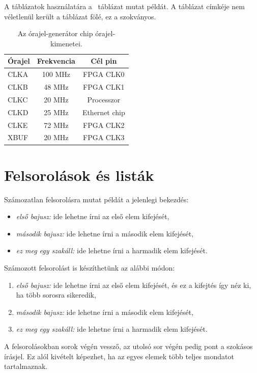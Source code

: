 A táblázatok használatára a ~táblázat mutat példát.
A táblázat címkéje nem véletlenül került a táblázat fölé, ez a szokványos.
\begin{table}[ht]
	\footnotesize
	\centering
	\caption{Az órajel-generátor chip órajel-kimenetei.} \label{tab:SysClocks}
	\begin{tabular}{ | l | c | c |}
	\hline
	Órajel & Frekvencia & Cél pin \\ \hline
	CLKA & 100 MHz & FPGA CLK0\\
	CLKB & 48 MHz  & FPGA CLK1\\
	CLKC & 20 MHz  & Processzor\\
	CLKD & 25 MHz  & Ethernet chip \\
	CLKE & 72 MHz  & FPGA CLK2\\
	XBUF & 20 MHz  & FPGA CLK3\\
	\hline
	\end{tabular}
	\label{tab:TabularExample}
\end{table}


\section{Felsorolások és listák}
Számozatlan felsorolásra mutat példát a jelenlegi bekezdés:
\begin{itemize}
	\item \emph{első bajusz:} ide lehetne írni az első elem kifejését,
	\item \emph{második bajusz:} ide lehetne írni a második elem kifejését,
	\item \emph{ez meg egy szakáll:} ide lehetne írni a harmadik elem kifejését.
\end{itemize}

Számozott felsorolást is készíthetünk az alábbi módon:
\begin{enumerate}
	\item \emph{első bajusz:} ide lehetne írni az első elem kifejését, és ez a kifejtés így néz ki, ha több sorosra sikeredik,
	\item \emph{második bajusz:} ide lehetne írni a második elem kifejését,
	\item \emph{ez meg egy szakáll:} ide lehetne írni a harmadik elem kifejését.
\end{enumerate}
A felsorolásokban sorok végén vessző, az utolsó sor végén pedig pont a szokásos írásjel. Ez alól kivételt képezhet, ha az egyes elemek több teljes mondatot tartalmaznak.

